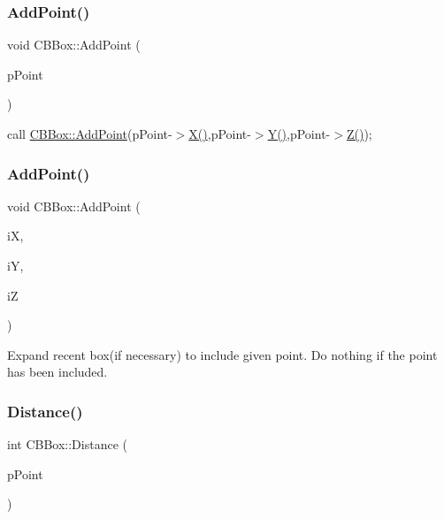 \subsubsection{\texorpdfstring{AddPoint()}{AddPoint()}\hspace{0.1cm}{\footnotesize\ttfamily [1/2]}}
{\footnotesize\ttfamily void C\+B\+Box\+::\+Add\+Point (\begin{DoxyParamCaption}\item[{\mbox{\hyperlink{classCPoint}{C\+Point}} $\ast$}]{p\+Point }\end{DoxyParamCaption})}

call \mbox{\hyperlink{classCBBox_a270d6116bfea826678ad54c2ab256a6c}{C\+B\+Box\+::\+Add\+Point}}(p\+Point-\/$>$\mbox{\hyperlink{classCBBox_a437bb0692398b1bb83d662b68beb0f3e}{X()}},p\+Point-\/$>$\mbox{\hyperlink{classCBBox_a5199b3a785f2bd06a53d8cd961c5a749}{Y()}},p\+Point-\/$>$\mbox{\hyperlink{classCBBox_a10a28f06a871f587524102491b9ae566}{Z()}}); \mbox{\label{classCBBox_a7051785c6750497f2b09d04a7aee82bd}} 
\subsubsection{\texorpdfstring{AddPoint()}{AddPoint()}\hspace{0.1cm}{\footnotesize\ttfamily [2/2]}}
{\footnotesize\ttfamily void C\+B\+Box\+::\+Add\+Point (\begin{DoxyParamCaption}\item[{int}]{iX,  }\item[{int}]{iY,  }\item[{int}]{iZ }\end{DoxyParamCaption})}

Expand recent box(if necessary) to include given point. Do nothing if the point has been included. \mbox{\label{classCBBox_a010e8dd4f397c7d12e4d3a28f4952acf}} 
\subsubsection{\texorpdfstring{Distance()}{Distance()}}
{\footnotesize\ttfamily int C\+B\+Box\+::\+Distance (\begin{DoxyParamCaption}\item[{\mbox{\hyperlink{classCPoint}{C\+Point}} $\ast$}]{p\+Point }\end{DoxyParamCaption})}

